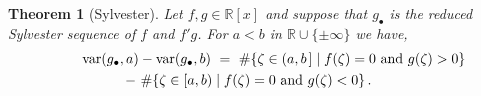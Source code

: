 \documentclass[12pt]{amsart}
\newtheorem{theorem}{Theorem}
\theoremstyle{definition}
\newcommand{\RR}{\mathbb{R}}
\DeclareMathOperator{\var}{{\rm var}}
\begin{document}
\begin{theorem}[Sylvester]
  \label{Th:Sylvester}
  Let $f,g\in\RR[x]$ and suppose that $g_\bullet$ is the reduced Sylvester sequence of $f$ and $f'g$.
  For $a<b$ in $\RR\cup\{\pm\infty\}$ we have,
  \begin{multline*}
    \qquad\var(g_\bullet,a)-\var(g_\bullet,b)\ =\
    \#\{\zeta\in(a,b\hspace{.05cm}]\mid f(\zeta)=0\mbox{ and } g(\zeta)>0\}\\
      \ -\
    \#\{\zeta\in[a,b)\mid f(\zeta)=0\mbox{ and } g(\zeta)<0\}\,.\qquad
  \end{multline*}
\end{theorem}
\end{document}
